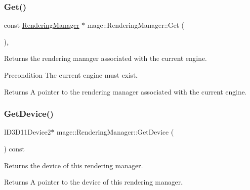 \subsubsection{\texorpdfstring{Get()}{Get()}}
{\footnotesize\ttfamily const \hyperlink{classmage_1_1_rendering_manager}{Rendering\+Manager} $\ast$ mage\+::\+Rendering\+Manager\+::\+Get (\begin{DoxyParamCaption}{ }\end{DoxyParamCaption})\hspace{0.3cm}{\ttfamily [static]}, {\ttfamily [noexcept]}}

Returns the rendering manager associated with the current engine.

\begin{DoxyPrecond}{Precondition}
The current engine must exist. 
\end{DoxyPrecond}
\begin{DoxyReturn}{Returns}
A pointer to the rendering manager associated with the current engine. 
\end{DoxyReturn}
\hypertarget{classmage_1_1_rendering_manager_a9881f16fe6b212d4650f65e7a273b329}{}\label{classmage_1_1_rendering_manager_a9881f16fe6b212d4650f65e7a273b329} 
\subsubsection{\texorpdfstring{Get\+Device()}{GetDevice()}}
{\footnotesize\ttfamily I\+D3\+D11\+Device2$\ast$ mage\+::\+Rendering\+Manager\+::\+Get\+Device (\begin{DoxyParamCaption}{ }\end{DoxyParamCaption}) const\hspace{0.3cm}{\ttfamily [noexcept]}}

Returns the device of this rendering manager.

\begin{DoxyReturn}{Returns}
A pointer to the device of this rendering manager. 
\end{DoxyReturn}
\hypertarget{classmage_1_1_rendering_manager_aac3ba0082e34614ce6bcef33fb89ce85}{}\label{classmage_1_1_rendering_manager_aac3ba0082e34614ce6bcef33fb89ce85} 

